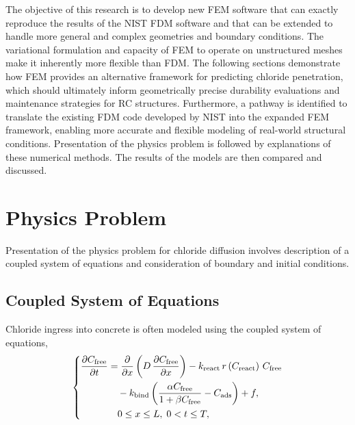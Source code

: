 \documentclass[conference]{IEEEtran}
\begin{document}
The objective of this research is to develop new FEM software that can exactly reproduce the results of the NIST FDM software and that can be extended to handle more general and complex geometries and boundary conditions.
The variational formulation and capacity of FEM to operate on unstructured meshes make it inherently more flexible than FDM. 
The following sections demonstrate how FEM provides an alternative framework for predicting chloride penetration, which should ultimately inform geometrically precise durability evaluations and maintenance strategies for RC structures.
Furthermore, a pathway is identified to translate the existing FDM code developed by NIST into the expanded FEM framework, enabling more accurate and flexible modeling of real-world structural conditions.
Presentation of the physics problem is followed by explanations of these numerical methods.
The results of the models are then compared and discussed.

\section{Physics Problem}

Presentation of the physics problem for chloride diffusion involves description of a coupled system of equations and consideration of boundary and initial conditions.

\subsection{Coupled System of Equations}

Chloride ingress into concrete is often modeled using the coupled system of equations,
\begin{equation}
\left \{
\begin{aligned}
\frac{\partial C_{\mathrm{free}}}{\partial t}
&=
\frac{\partial}{\partial x}
\left(
D\,\frac{\partial C_{\mathrm{free}}}{\partial x}
\right)
-
k_{\rm react}\, r\left(
C_{\mathrm{react}}
\right)\, C_{\mathrm{free}}\\
&\quad - k_{\mathrm{bind}}
\left(
\frac{\alpha C_{\mathrm{free}}}{1 + \beta C_{\mathrm{free}}}
-
C_{\mathrm{ads}}
\right)
+
f, \\
&\quad 0 \leq x \leq L,\; 0 < t \leq T,
\end{aligned}
\right.
\label{eq:diff_react}
\end{equation}
\end{document}
